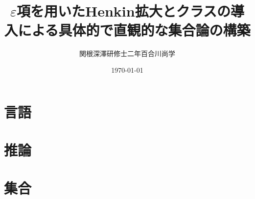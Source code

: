 \documentclass[a4j,10.5pt,oneside,openany]{jsreport}
\title{$\varepsilon$項を用いたHenkin拡大とクラスの導入による具体的で直観的な集合論の構築}
\author{関根深澤研修士二年百合川尚学}
\date{\today}
\theoremstyle{mystyle}
\begin{document}
\maketitle
\tableofcontents

%


\chapter{言語}
	
	
	

\chapter{推論}
\label{chap:inference}
	
	
	
	
%	

\chapter{集合}	
	
	
	
	
	
	
%	
	
	
	
%	
%	
%	
%	
%	
%	
%	
%	
%	
\end{document}

